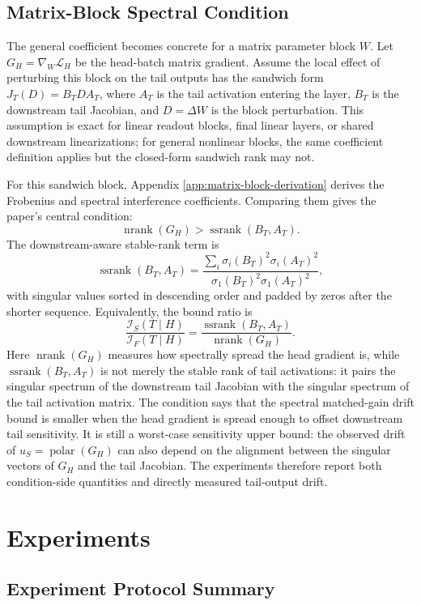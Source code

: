\documentclass{article}
\theoremstyle{definition}
\newcommand{\Loss}{\mathcal L}
\newcommand{\I}{\mathcal I}
\newcommand{\nrank}{\operatorname{nrank}}
\newcommand{\ssrank}{\operatorname{ssrank}}
\newcommand{\polar}{\operatorname{polar}}
\begin{document}
\subsection{Matrix-Block Spectral Condition}

The general coefficient becomes concrete for a matrix parameter block \(W\). Let \(G_H=\nabla_W\Loss_H\) be the head-batch matrix gradient. Assume the local effect of perturbing this block on the tail outputs has the sandwich form \(J_T(D)=B_TDA_T\), where \(A_T\) is the tail activation entering the layer, \(B_T\) is the downstream tail Jacobian, and \(D=\Delta W\) is the block perturbation. This assumption is exact for linear readout blocks, final linear layers, or shared downstream linearizations; for general nonlinear blocks, the same coefficient definition applies but the closed-form sandwich rank may not.

For this sandwich block, Appendix \ref{app:matrix-block-derivation} derives the Frobenius and spectral interference coefficients. Comparing them gives the paper's central condition:
\[
\boxed{
\nrank(G_H)>\ssrank(B_T,A_T).
}
\]
The downstream-aware stable-rank term is
\[
\ssrank(B_T,A_T)
=
\frac{
\sum_i\sigma_i(B_T)^2\sigma_i(A_T)^2
}{
\sigma_1(B_T)^2\sigma_1(A_T)^2
},
\]
with singular values sorted in descending order and padded by zeros after the shorter sequence.
Equivalently, the bound ratio is
\[
\frac{\I_S(T\mid H)}{\I_F(T\mid H)}
=
\frac{\ssrank(B_T,A_T)}{\nrank(G_H)}.
\]
Here \(\nrank(G_H)\) measures how spectrally spread the head gradient is, while \(\ssrank(B_T,A_T)\) is not merely the stable rank of tail activations: it pairs the singular spectrum of the downstream tail Jacobian with the singular spectrum of the tail activation matrix. The condition says that the spectral matched-gain drift bound is smaller when the head gradient is spread enough to offset downstream tail sensitivity. It is still a worst-case sensitivity upper bound: the observed drift of \(u_S=\polar(G_H)\) can also depend on the alignment between the singular vectors of \(G_H\) and the tail Jacobian. The experiments therefore report both condition-side quantities and directly measured tail-output drift.

\section{Experiments}

\subsection{Experiment Protocol Summary}
\label{sec:experiment-protocol-summary}
\end{document}
